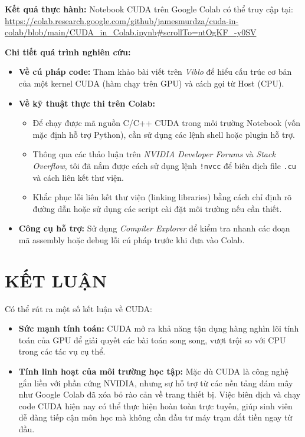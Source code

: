 \documentclass[12pt,a4paper]{article}
\begin{document}
\textbf{Kết quả thực hành:} Notebook CUDA trên Google Colab có thể truy cập tại: \\
\url{https://colab.research.google.com/github/jamesmurdza/cuda-in-colab/blob/main/CUDA_in_Colab.ipynb#scrollTo=ntOgKF_-y0SV}

\textbf{Chi tiết quá trình nghiên cứu:}

\begin{itemize}
    \item \textbf{Về cú pháp code:} Tham khảo bài viết trên \textit{Viblo} để hiểu cấu trúc cơ bản của một kernel CUDA (hàm chạy trên GPU) và cách gọi từ Host (CPU).
    \item \textbf{Về kỹ thuật thực thi trên Colab:}
    \begin{itemize}
        \item Để chạy được mã nguồn C/C++ CUDA trong môi trường Notebook (vốn mặc định hỗ trợ Python), cần sử dụng các lệnh shell hoặc plugin hỗ trợ.
        \item Thông qua các thảo luận trên \textit{NVIDIA Developer Forums} và \textit{Stack Overflow}, tôi đã nắm được cách sử dụng lệnh \texttt{!nvcc} để biên dịch file \texttt{.cu} và cách liên kết thư viện.
        \item Khắc phục lỗi liên kết thư viện (linking libraries) bằng cách chỉ định rõ đường dẫn hoặc sử dụng các script cài đặt môi trường nếu cần thiết.
    \end{itemize}
    \item \textbf{Công cụ hỗ trợ:} Sử dụng \textit{Compiler Explorer} để kiểm tra nhanh các đoạn mã assembly hoặc debug lỗi cú pháp trước khi đưa vào Colab.
\end{itemize}

\section{KẾT LUẬN}
Có thể rút ra một số kết luận về CUDA:

\begin{itemize}
    \item \textbf{Sức mạnh tính toán:} CUDA mở ra khả năng tận dụng hàng nghìn lõi tính toán của GPU để giải quyết các bài toán song song, vượt trội so với CPU trong các tác vụ cụ thể.
    \item \textbf{Tính linh hoạt của môi trường học tập:} Mặc dù CUDA là công nghệ gắn liền với phần cứng NVIDIA, nhưng sự hỗ trợ từ các nền tảng đám mây như Google Colab đã xóa bỏ rào cản về trang thiết bị. Việc biên dịch và chạy code CUDA hiện nay có thể thực hiện hoàn toàn trực tuyến, giúp sinh viên dễ dàng tiếp cận môn học mà không cần đầu tư máy trạm đắt tiền ngay từ đầu.
\end{itemize}
\end{document}
